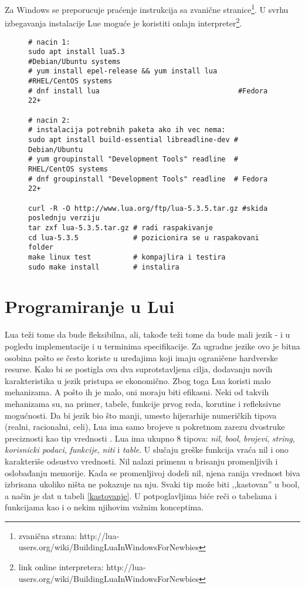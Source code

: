 \documentclass[a4paper]{article}
\begin{document}
 Za Windows se preporucuje praćenje instrukcija sa zvanične stranice\footnote{zvanična strana: http://lua-users.org/wiki/BuildingLuaInWindowsForNewbies}. U svrhu izbegavanja instalacije Lue moguće je koristiti onlajn interpreter\footnote{link online interpretera: http://lua-users.org/wiki/BuildingLuaInWindowsForNewbies}.

\begin{figure}

\begin{lstlisting}[caption={Instalacija iz terminala na linuxu},frame=single, label=simple]
# nacin 1:
sudo apt install lua5.3	                      #Debian/Ubuntu systems 
# yum install epel-release && yum install lua	#RHEL/CentOS systems 
# dnf install lua		                          #Fedora 22+

# nacin 2:
# instalacija potrebnih paketa ako ih vec nema:
sudo apt install build-essential libreadline-dev # Debian/Ubuntu
# yum groupinstall "Development Tools" readline	 # RHEL/CentOS systems 
# dnf groupinstall "Development Tools" readline	 # Fedora 22+

curl -R -O http://www.lua.org/ftp/lua-5.3.5.tar.gz #skida poslednju verziju
tar zxf lua-5.3.5.tar.gz # radi raspakivanje
cd lua-5.3.5             # pozicionira se u raspakovani folder 
make linux test          # kompajlira i testira
sudo make install        # instalira
\end{lstlisting}
\label{kod_instalacija}
\end{figure}

\section{Programiranje u Lui}
\label{sec:programiranje}


Lua teži tome da bude fleksibilna, ali, takođe teži tome da bude mali jezik - i u pogledu implementacije i u terminima specifikacije. Za ugradne jezike ovo je bitna osobina pošto se često koriste u uređajima koji imaju ograničene hardverske resurse. Kako bi se postigla ova dva suprotstavljena cilja, dodavanju novih karakteristika u jezik pristupa se ekonomično. Zbog toga Lua koristi malo mehanizama. A pošto ih je malo, oni moraju biti efikasni. Neki od takvih mehanizama su, na primer, tabele, funkcije prvog reda, korutine i refleksivne mogućnosti. Da bi jezik bio što manji, umesto hijerarhije numeričkih tipova (realni, racionalni, celi), Lua ima samo brojeve u pokretnom zarezu dvostruke preciznosti kao tip vrednosti \cite{multiParadigms}.
Lua ima ukupno 8 tipova: \textit{nil}, \textit{bool}, \textit{brojevi}, \textit{string}, \textit{korisnicki podaci}, \textit{funkcije}, \textit{niti} i \textit{table}. U slučaju greške funkcija vraća nil i ono karakteriše odsustvo vrednosti. Nil nalazi primenu u brisanju promenljivih i oslobađanju memorije. Kada se promenljivoj dodeli nil, njena ranija vrednost biva izbrisana ukoliko ništa ne pokazuje na nju. Svaki tip može biti ,,kastovan'' u bool, a način je dat u tabeli \ref{kastovanje}. U potpoglavljima biće reči o tabelama i funkcijama kao i o nekim njihovim važnim konceptima.
\end{document}
